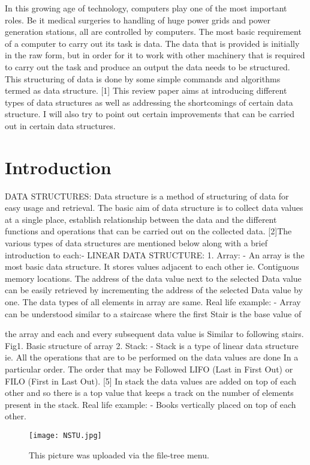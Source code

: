 \documentclass{rmf-d}
\begin{document}
\vspace{-8pt}
\begin{multicols}{2}

In this growing age of technology, computers
play one of the most important roles. Be it medical
surgeries to handling of huge power grids and power
generation stations, all are controlled by computers. The
most basic requirement of a computer to carry out its task
is data. The data that is provided is initially in the raw
form, but in order for it to work with other machinery that
is required to carry out the task and produce an output the
data needs to be structured. This structuring of data is
done by some simple commands and algorithms termed as
data structure. [1] This review paper aims at introducing
different types of data structures as well as addressing the
shortcomings of certain data structure. I will also try to
point out certain improvements that can be carried out in
certain data structures.

\section{Introduction}

DATA STRUCTURES:
Data structure is a method of structuring of data for
easy usage and retrieval. The basic aim of data
structure is to collect data values at a single place,
establish relationship between the data and the
different functions and operations that can be carried
out on the collected data. 
[2]The various types of data
structures are mentioned below along with a brief
introduction to each:-
LINEAR DATA STRUCTURE:
1. Array: - An array is the most basic data structure.
It stores values adjacent to each other ie.
Contiguous memory locations. The address of the
data value next to the selected Data value can be
easily retrieved by incrementing the address of the
selected Data value by one. The data types of all
elements in array are same.
Real life example: - Array can be understood similar
to a staircase where the first Stair is the base value of

the array and each and every subsequent data value is
Similar to following stairs.
Fig1. Basic structure of array
2. Stack: - Stack is a type of linear data structure ie.
All the operations that are to be performed on the
data values are done In a particular order. The order
that may be Followed LIFO (Last in First Out) or
FILO (First in Last Out). [5] In stack the data values
are added on top of each other and so there is a top
value that keeps a track on the number of elements
present in the stack. Real life example: - Books
vertically placed on top of each other.
\begin{figure}
\centering
\texttt{[image: NSTU.jpg]}
\caption{\label{fig:NSTU}This picture was uploaded via the file-tree menu.}
\end{figure}



\end{multicols}
\end{document}
